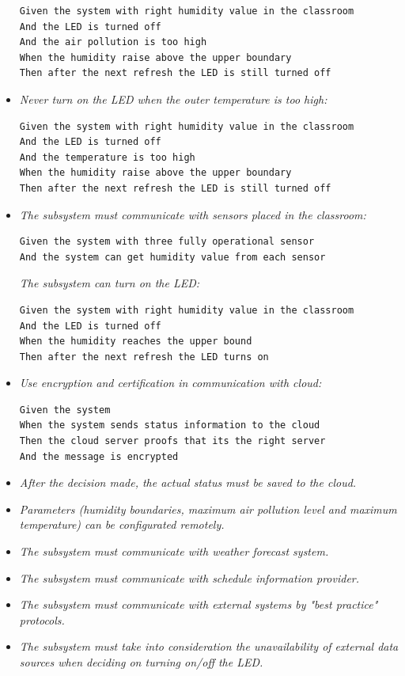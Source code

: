 \documentclass{article}
\begin{document}
\begin{itemize}
\begin{verbatim}
Given the system with right humidity value in the classroom
And the LED is turned off
And the air pollution is too high
When the humidity raise above the upper boundary
Then after the next refresh the LED is still turned off
\end{verbatim}
\item \textit{Never turn on the LED when the outer temperature is too high:}
\begin{verbatim}
Given the system with right humidity value in the classroom
And the LED is turned off
And the temperature is too high
When the humidity raise above the upper boundary
Then after the next refresh the LED is still turned off
\end{verbatim}
\item \textit{The subsystem must communicate with sensors placed in the classroom:}
\begin{verbatim}
Given the system with three fully operational sensor
And the system can get humidity value from each sensor
\end{verbatim}
\textit{The subsystem can turn on the LED:}
\begin{verbatim}
Given the system with right humidity value in the classroom
And the LED is turned off
When the humidity reaches the upper bound
Then after the next refresh the LED turns on
\end{verbatim}
\item \textit{Use encryption and certification in communication with cloud:}
\begin{verbatim}
Given the system
When the system sends status information to the cloud
Then the cloud server proofs that its the right server
And the message is encrypted
\end{verbatim}
\item \textit{After the decision made, the actual status must be saved to the cloud.}\\
\item \textit{Parameters (humidity boundaries, maximum air pollution level and maximum temperature) can be configurated remotely.}
\item \textit{The subsystem must communicate with weather forecast system.}
\item \textit{The subsystem must communicate with schedule information provider.}
\item \textit{The subsystem must communicate with external systems by "best practice" protocols.}
\item \textit{The subsystem must take into consideration the unavailability of external data sources when deciding on turning on/off the LED.}
\end{itemize}
\end{document}
